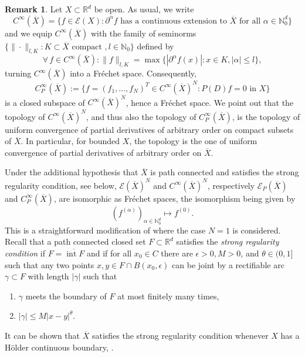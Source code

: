 \documentclass[a4paper,10pt]{amsart}
\newtheorem*{crucial lemma}{Lemma \ref{lem:nice polynomial2}}
\theoremstyle{definition}
\newtheorem{remark}[theorem]{Remark}
\newcommand{\R}{\mathbb{R}}
\newcommand{\N}{\mathbb{N}}
\begin{document}
\begin{remark}\label{rem:Hoelder continuous boundary}
	Let $X\subset\R^d$ be open. As usual, we write
	\[C^\infty(\overline{X})=\{f\in \mathscr{E}(X)\colon \partial^\alpha f \text{ has a continuous extension to }\overline{X} \text{ for all }\alpha\in\N_0^d \}\] 
	and we equip $C^\infty(\overline{X})$ with the family of seminorms $\{\|\cdot\|_{l,K}\colon K\subset\overline{X}\text{ compact }, l\in\N_0\}$ defined by
	\[\forall\,f\in C^\infty(\overline{X})\colon \|f\|_{l,K}=\max\{|\partial^\alpha f(x)|\colon x\in K, |\alpha|\leq l\},\]
	turning $C^\infty(\overline{X})$ into a Fr\'echet space. Consequently,
	\[C^\infty_P(\overline{X}):=\{f=(f_1,\ldots,f_N)^T\in C^\infty(\overline{X})^N\colon P(D)f=0 \text{ in }X\}\]
	is a closed subspace of $C^\infty(\overline{X})^N$, hence a Fr\'echet space. We point out that the topology of  $C^\infty(\overline{X})^N$, and thus also the topology of $C^\infty_P(\overline{X})$, is the topology of uniform convergence of partial derivatives of arbitrary order on compact subsets of $\overline{X}$. In particular, for bounded $X$, the topology is the one of uniform convergence of partial derivatives of arbitrary order on $\overline{X}$.
	
	Under the additional hypothesis that $\overline{X}$ is path connected and satisfies the strong regularity condition, see below, $\mathscr{E}(\overline{X})^N$ and $C^\infty(\overline{X})^N$, respectively $\mathscr{E}_P(\overline{X})$ and $C^\infty_P(\overline{X})$, are isomorphic as Fr\'echet spaces, the isomorphism being given by
	\[(f^{(\alpha)})_{\alpha\in\N_0^d}\mapsto f^{(0)}.\]
	This is a straightforward modification of \cite[Corollary 11]{CiasKalmes2025} where the case $N=1$ is considered. Recall that a path connected closed set $F\subset\R^d$  satisfies the \emph{strong regularity condition} if $F=\overline{\operatorname{int}F}$ and if for all $x_0\in C$ there are $\epsilon>0, M>0$, and $\theta\in (0,1]$ such that any two points $x,y\in F\cap B(x_0,\epsilon)$ can be joint by a rectifiable arc $\gamma\subset F$ with length $|\gamma|$ such that
	\begin{enumerate}
		\item $\gamma$ meets the boundary of $F$ at most finitely many times,
		\item $|\gamma|\leq M|x-y|^\theta$.
	\end{enumerate}
	It can be shown that $\overline{X}$ satisfies the strong regularity condition whenever $X$ has a H\"older continuous boundary, \cite[Appendix]{CiasKalmes2025}. 
\end{remark}
\end{document}
